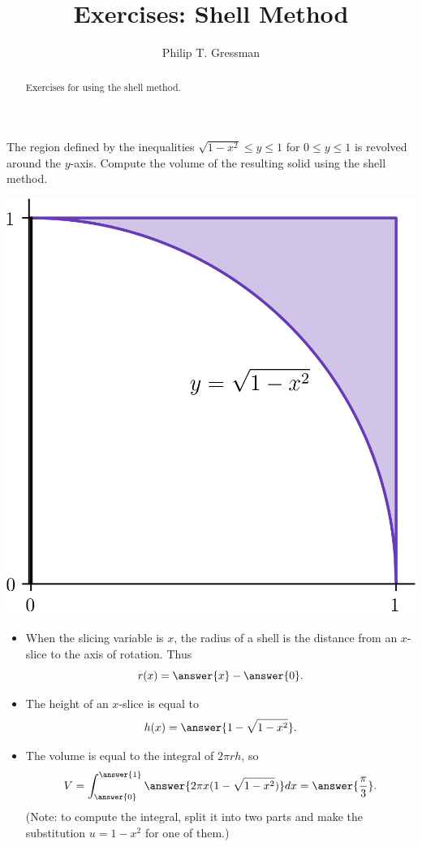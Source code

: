 \documentclass{ximera}
\title{Exercises: Shell Method}
\author{Philip T. Gressman}
\begin{document}
\begin{abstract}
Exercises for using the shell method.
\end{abstract}
\maketitle

\begin{exercise}
The region defined by the inequalities $\sqrt{1-x^2} \leq y \leq 1$ for $0 \leq y \leq 1$ is revolved around the $y$-axis. Compute the volume of the resulting solid using the shell method.
\begin{center}
\begin{image}
\includegraphics{shell/shell03.png}
\end{image}
\end{center}
\begin{itemize}
\item When the slicing variable is $x$, the radius of a shell is the  distance from an $x$-slice to the axis of rotation. Thus
\[ r(x) = \answer{x} - \answer{0}. \]
\item The height of an $x$-slice is equal to
\[ h(x) = \answer{1 - \sqrt{1 - x^2}}. \]
\item The volume is equal to the integral of $2 \pi r h$, so 
\[ V = \int_{\answer{0}}^{\answer{1}} \answer{2 \pi x ( 1 - \sqrt{1-x^2}) } dx = \answer{\frac{\pi}{3}}. \]
(Note: to compute the integral, split it into two parts and make the substitution $u = 1-x^2$ for one of them.)
\end{itemize}
\end{exercise}
\end{document}
